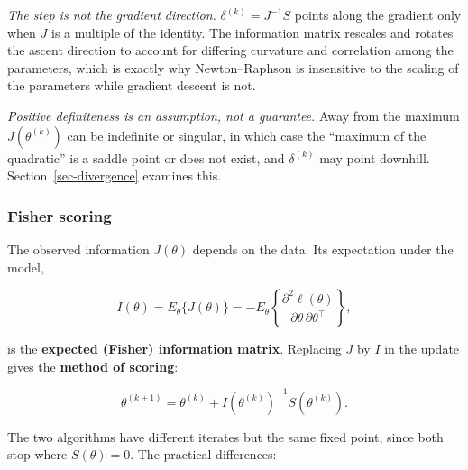 \documentclass[
  letterpaper,
  DIV=11,
  numbers=noendperiod]{scrreprt}
\begin{document}
\emph{The step is not the gradient direction.}
\(\delta^{(k)} = J^{-1}S\) points along the gradient only when \(J\) is
a multiple of the identity. The information matrix rescales and rotates
the ascent direction to account for differing curvature and correlation
among the parameters, which is exactly why Newton--Raphson is
insensitive to the scaling of the parameters while gradient descent is
not.

\emph{Positive definiteness is an assumption, not a guarantee.} Away
from the maximum \(J(\theta^{(k)})\) can be indefinite or singular, in
which case the ``maximum of the quadratic'' is a saddle point or does
not exist, and \(\delta^{(k)}\) may point downhill.
Section~\ref{sec-divergence} examines this.

\subsubsection{Fisher scoring}\label{fisher-scoring}

The observed information \(J(\theta)\) depends on the data. Its
expectation under the model,

\[
I(\theta) = E_{\theta}\{J(\theta)\} = -E_{\theta}\left\{ \frac{\partial^2 \ell(\theta)}{\partial \theta \, \partial \theta^{\top}} \right\},
\]

is the \textbf{expected (Fisher) information matrix}. Replacing \(J\) by
\(I\) in the update gives the \textbf{method of scoring}:

\[
\theta^{(k+1)} = \theta^{(k)} + I(\theta^{(k)})^{-1} S(\theta^{(k)}).
\]

The two algorithms have different iterates but the same fixed point,
since both stop where \(S(\theta) = 0\). The practical differences:
\end{document}
